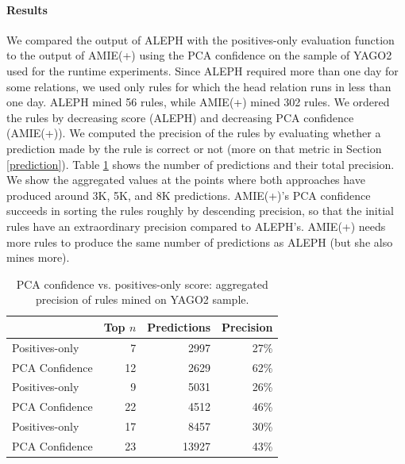 \paragraph{Results}
We compared the output of ALEPH with the positives-only evaluation function to the output of AMIE(+) using the PCA
confidence on the sample of YAGO2 used for the runtime experiments.
Since ALEPH required more than one day for some relations, we used only rules for which the head
relation runs in less than one day.
ALEPH mined 56 rules, while AMIE(+) mined 302 rules.
We ordered the rules by decreasing score (ALEPH) and decreasing PCA confidence (AMIE(+)). We computed the precision of the rules by evaluating whether a prediction made by the rule is correct or not (more on that metric in Section \ref{prediction}).
Table \ref{alephres} shows the number of predictions and their total precision.
We show the aggregated values at the points where both approaches have produced around 3K, 5K, and 8K predictions.
AMIE(+)'s PCA confidence succeeds in sorting the rules roughly by descending precision, so that the initial rules have an extraordinary precision
compared to ALEPH's.
AMIE(+) needs more rules to produce the same number of predictions as ALEPH (but she also mines more).

\begin{table}
\begin{tabular}{l|rrr}
	    & Top $n$ & Predictions & Precision \\
 \hline
 Positives-only & 7 & 2997 & 27\% \\
 PCA Confidence & 12 & 2629 & 62\% \\
 \hline
 Positives-only & 9 & 5031 & 26\% \\
 PCA Confidence & 22 & 4512& 46\% \\
 \hline
 Positives-only & 17 & 8457 & 30\% \\
 PCA Confidence & 23 & 13927  & 43\% \\
\end{tabular}
\caption{PCA confidence vs. positives-only score: aggregated precision of rules mined on YAGO2 sample.}
\label{alephres}
\end{table}

